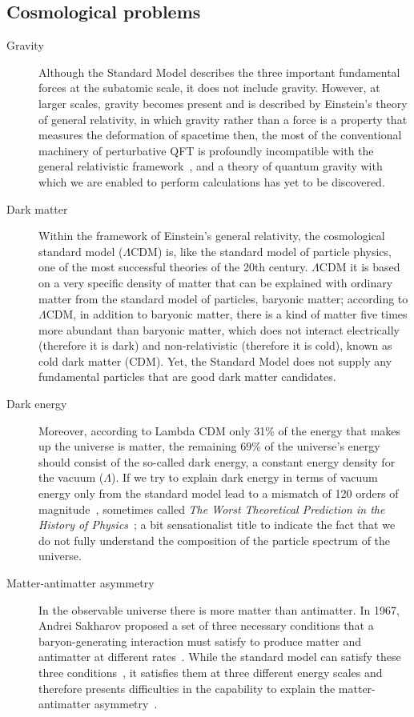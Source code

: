 \subsection{Cosmological problems}
\begin{description}
	\item[Gravity] Although the Standard Model describes the three important fundamental forces at the subatomic scale, it does not include gravity. However, at larger scales, gravity becomes present and is described by Einstein's theory of general relativity, in which gravity rather than a force is a property that measures the deformation of spacetime then, the most of the conventional machinery of perturbative QFT is profoundly incompatible with the general relativistic framework~\parencite{book:217893}, and a theory of quantum gravity with which we are enabled to perform calculations has yet to be discovered.
	
	
	
	
	\item[Dark matter] Within the framework of Einstein's general relativity, the cosmological standard model ($\Lambda$CDM) is, like the standard model of particle physics, one of the most successful theories of the 20th century. $\Lambda$CDM it is based on a very specific density of matter that can be explained with ordinary matter from the standard model of particles, baryonic matter; according to $\Lambda$CDM, in addition to baryonic matter, there is a kind of matter five times more abundant than baryonic matter, which does not interact electrically (therefore it is dark) and non-relativistic (therefore it is cold), known as cold dark matter (CDM).  Yet, the Standard Model does not supply any fundamental particles that are good dark matter candidates.
	\item[Dark energy] Moreover, according to Lambda CDM only 31\% of the energy that makes up the universe is matter, the remaining 69\% of the universe's energy should consist of the so-called dark energy, a constant energy density for the vacuum ($\Lambda$). If we try to explain dark energy in terms of vacuum energy only from the standard model lead to a mismatch of 120 orders of magnitude~\parencite{Adler1995}, sometimes called \textit{The Worst Theoretical Prediction in the History of Physics}~\parencite{book:15261}; a bit sensationalist title to indicate the fact that we do not fully understand the composition of the particle spectrum of the universe.
	
	\item[Matter-antimatter asymmetry] In the observable universe there is more matter than antimatter. In 1967, Andrei Sakharov proposed a set of three necessary conditions that a baryon-generating interaction must satisfy to produce matter and antimatter at different rates~\parencite{1967JETPL...5...24S}. While the standard model can satisfy these three conditions~\parencite{PhysRevLett.37.8,ph/0609145},  it satisfies them at three different energy scales and therefore presents difficulties in the capability to explain the  matter-antimatter asymmetry~\parencite{robinson2011symmetry}. 
	
\end{description}
